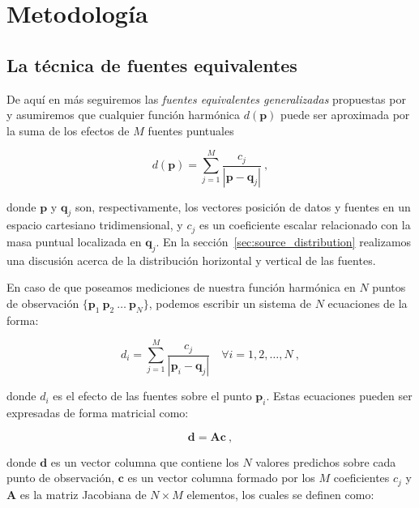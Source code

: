 \section{Metodología}

\subsection{La técnica de fuentes equivalentes}
\label{sec:equivalent-sources-technique}

De aquí en más seguiremos las \emph{fuentes equivalentes generalizadas}
propuestas por \citet{cordell1992}
y asumiremos que cualquier función harmónica $d(\mathbf{p})$
puede ser aproximada por la suma de los efectos de $M$ fuentes puntuales

\begin{equation}
    d(\mathbf{p})
    =
    \sum\limits_{j=1}^{M} \frac{c_j}{| \mathbf{p} - \mathbf{q}_j
    |} \ ,
    \label{eq:eql-forward}
\end{equation}

\noindent donde $\mathbf{p}$ y $\mathbf{q}_j$ son, respectivamente, los
vectores posición de datos y fuentes en un espacio cartesiano tridimensional,
y $c_j$ es un coeficiente escalar relacionado con la masa puntual localizada en
$\mathbf{q}_j$.
En la sección~\ref{sec:source_distribution} realizamos una discusión acerca de
la distribución horizontal y vertical de las fuentes.

En caso de que poseamos mediciones de nuestra función harmónica en $N$ puntos
de observación
$\{\mathbf{p}_1\ \mathbf{p}_2\ \ldots\ \mathbf{p}_N\}$,
podemos escribir un sistema de $N$ ecuaciones de la forma:

\begin{equation}
    d_i
    =
    \sum\limits_{j=1}^{M} \frac{c_j}{| \mathbf{p}_i - \mathbf{q}_j
    |}
    \quad \forall i=1,2,\ldots,N
    \ ,
    \label{eq:forward-sum}
\end{equation}

\noindent donde $d_i$ es el efecto de las fuentes sobre el punto
$\mathbf{p}_i$.
Estas ecuaciones pueden ser expresadas de forma matricial como:

\begin{equation}
    \mathbf{d} = \mathbf{A} \mathbf{c} \ ,
    \label{eq:linear-problem}
\end{equation}

\noindent donde $\mathbf{d}$ es un vector columna que contiene los $N$ valores
predichos sobre cada punto de observación,
$\mathbf{c}$ es un vector columna formado por los $M$ coeficientes $c_j$ y
$\mathbf{A}$ es la matriz Jacobiana de $N \times M$ elementos,
los cuales se definen como:

